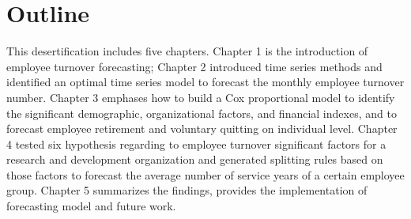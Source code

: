 \section{Outline}
This desertification includes five chapters. Chapter 1 is the introduction of employee turnover forecasting; Chapter 2 introduced time series methods and identified an optimal time series model to forecast the monthly employee turnover number. Chapter 3 emphases how to build a Cox proportional model to identify the significant demographic, organizational factors, and financial indexes, and to forecast employee retirement and voluntary quitting on individual level. Chapter 4 tested six hypothesis regarding to employee turnover significant factors for a research and development organization and generated splitting rules based on those factors to forecast the average number of service years of a certain employee group. Chapter 5 summarizes the findings, provides the implementation of forecasting model and future work.

